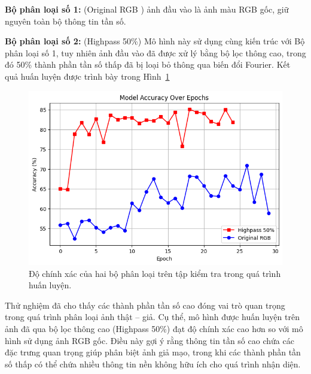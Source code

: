 \textbf{Bộ phân loại số 1:} (Original RGB ) ảnh đầu vào là ảnh màu RGB gốc, giữ nguyên toàn bộ thông tin tần số.  

\textbf{Bộ phân loại số 2:} (Highpass 50\%) Mô hình này sử dụng cùng kiến trúc với Bộ phân loại số 1, tuy nhiên ảnh đầu vào đã được xử lý bằng bộ lọc thông cao, trong đó 50\% thành phần tần số thấp đã bị loại bỏ thông qua biến đổi Fourier. Kết quả huấn luyện được trình bày trong Hình~\ref{fig:Experiment_Highpass50_percent}

%
\begin{figure}[h!]
	\centering
	\includegraphics[width=1.0\linewidth]{Images/Experiment_Highpass50_percent.png}
	\begin{minipage}{1.0\linewidth}
		\caption{Độ chính xác của hai bộ phân loại trên tập kiểm tra trong quá trình huấn luyện.}
		\label{fig:Experiment_Highpass50_percent}
	\end{minipage}
\end{figure}

%
Thử nghiệm đã cho thấy các thành phần tần số cao đóng vai trò quan trọng trong quá trình phân loại ảnh thật – giả. Cụ thể, mô hình được huấn luyện trên ảnh đã qua bộ lọc thông cao (Highpass 50\%) đạt độ chính xác cao hơn so với mô hình sử dụng ảnh RGB gốc. Điều này gợi ý rằng thông tin tần số cao chứa các đặc trưng quan trọng giúp phân biệt ảnh giả mạo, trong khi các thành phần tần số thấp có thể chứa nhiều thông tin nền không hữu ích cho quá trình nhận diện.  


%

